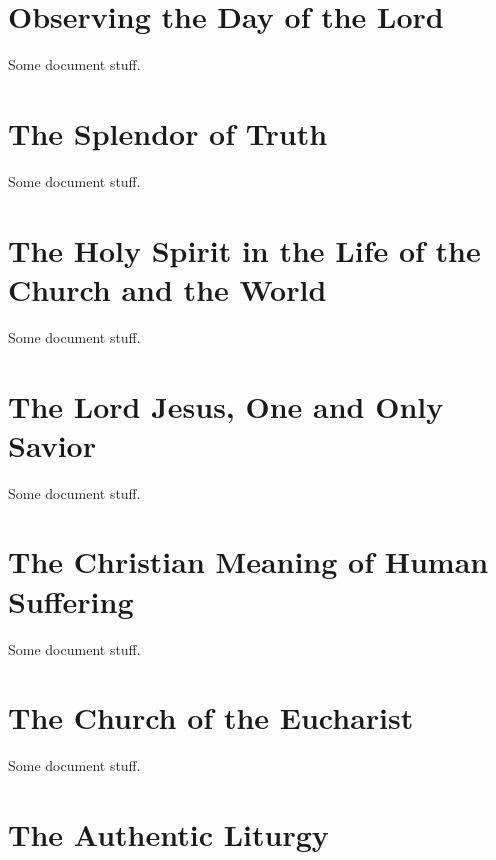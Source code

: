 \documentclass[oneside]{book}
\begin{document}
\chapter{Observing the Day of the Lord}

Some document stuff.


\chapter{The Splendor of Truth}

Some document stuff.


\chapter{The Holy Spirit in the Life of the Church and the World}

Some document stuff.


\chapter{The Lord Jesus, One and Only Savior}

Some document stuff.


\chapter{The Christian Meaning of Human Suffering}

Some document stuff.


\chapter{The Church of the Eucharist}

Some document stuff.


\chapter{The Authentic Liturgy}
\end{document}
